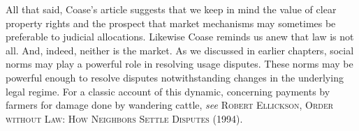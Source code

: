 All that said, Coase's article suggests that we keep in mind the value of clear
property rights and the prospect that market mechanisms may sometimes be
preferable to judicial allocations. Likewise Coase reminds us anew that law is
not all. And, indeed, neither is the market. As we discussed in earlier
chapters, social norms may play a powerful role in resolving usage disputes.
These norms may be powerful enough to resolve disputes notwithstanding changes
in the underlying legal regime. For a classic account of this dynamic,
concerning payments by farmers for damage done by wandering cattle, \textit{see}
\textsc{Robert Ellickson, Order without Law: How Neighbors Settle Disputes}
(1994). 


